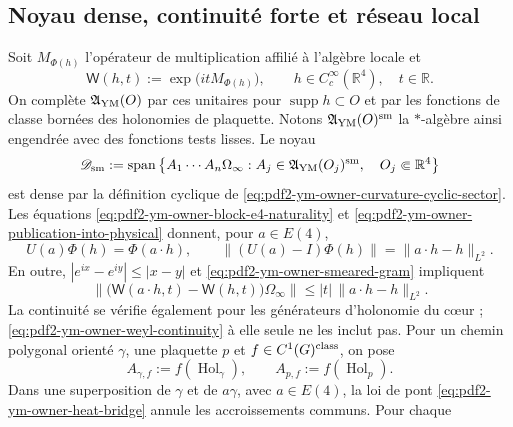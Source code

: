 \subsection{Noyau dense, continuité forte et réseau local}

Soit $M_{\Phi(h)}$ l'opérateur de multiplication affilié à l'algèbre locale et
\begin{equation}\label{eq:pdf2-ym-owner-curvature-weyl}
 \mathsf W(h,t):=\exp\!\bigl(itM_{\Phi(h)}\bigr),
 \qquad h\in C_c^\infty(\mathbb R^4),\quad t\in\mathbb R.
\end{equation}
On complète $\mathfrak A_{\rm YM}(O)$ par ces unitaires pour
$\operatorname{supp}h\subset O$ et par les fonctions de classe bornées des
holonomies de plaquette. Notons $\mathfrak A_{\rm YM}(O)^{\rm sm}$ la
$*$-algèbre ainsi engendrée avec des fonctions tests lisses. Le noyau
\begin{equation}\label{eq:pdf2-ym-owner-smooth-core}
 \mathscr D_{\rm sm}:=\operatorname{span}\left\{
 A_1\cdots A_n\Omega_\infty:
 A_j\in\mathfrak A_{\rm YM}(O_j)^{\rm sm},\quad
 O_j\Subset\mathbb R^4\right\}
\end{equation}
est dense par la définition cyclique de \eqref{eq:pdf2-ym-owner-curvature-cyclic-sector}. Les équations \eqref{eq:pdf2-ym-owner-block-e4-naturality} et \eqref{eq:pdf2-ym-owner-publication-into-physical} donnent, pour $a\in E(4)$,
\begin{equation}\label{eq:pdf2-ym-owner-field-e4-covariance}
 U(a)\Phi(h)=\Phi(a\!\cdot h),
 \qquad
 \|(U(a)-I)\Phi(h)\|=\|a\!\cdot h-h\|_{L^2}.
\end{equation}
En outre, $|e^{ix}-e^{iy}|\le|x-y|$ et
\eqref{eq:pdf2-ym-owner-smeared-gram} impliquent
\begin{equation}\label{eq:pdf2-ym-owner-weyl-continuity}
 \|\bigl(\mathsf W(a\!\cdot h,t)-\mathsf W(h,t)\bigr)\Omega_\infty\|
 \le |t|\,\|a\!\cdot h-h\|_{L^2}.
\end{equation}
La continuité se vérifie également pour les générateurs d'holonomie du cœur ; \eqref{eq:pdf2-ym-owner-weyl-continuity} à elle seule ne les inclut pas. Pour un chemin polygonal orienté $\gamma$, une plaquette $p$ et $f\in C^1(G)^{\rm class}$, on pose
\begin{equation}\label{eq:pdf2-ym-owner-holonomy-core-generators}
 A_{\gamma,f}:=f(\operatorname{Hol}_\gamma),
 \qquad A_{p,f}:=f(\operatorname{Hol}_p).
\end{equation}
Dans une superposition de $\gamma$ et de $a\gamma$, avec $a\in E(4)$, la loi de pont
\eqref{eq:pdf2-ym-owner-heat-bridge} annule les accroissements communs. Pour chaque
